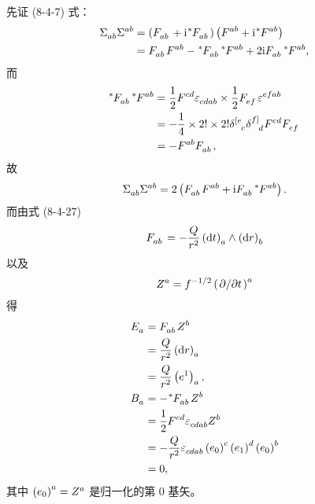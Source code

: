 \begin{xiti}
	\begin{zm}
		先证 (8-4-7) 式：
		\begin{equation*}
			\begin{split}
				\tensor{\Sigma}{_a_b} \tensor{\Sigma}{^a^b} &= \left( \tensor{F}{_a_b} + \ii \tensor[^*]{F}{_a_b} \right) \left( \tensor{F}{^a^b} + \ii \tensor[^*]{F}{^a^b} \right)\\
				&= \tensor{F}{_a_b} \tensor{F}{^a^b} - \tensor[^*]{F}{_a_b} \tensor[^*]{F}{^a^b} + 2\ii \tensor{F}{_a_b} \tensor[^*]{F}{^a^b},
			\end{split}
		\end{equation*}
		而
		\begin{equation}
			\begin{split}
				\tensor[^*]{F}{_a_b} \tensor[^*]{F}{^a^b} &= \frac{1}{2} \tensor{F}{^c^d} \tensor{\varepsilon}{_c_d_a_b} \times \frac{1}{2} \tensor{F}{_e_f} \tensor{\varepsilon}{^e^f^a^b}\\
				&= - \frac{1}{4} \times 2! \times 2! \tensor{\delta}{^{[e}_c} \tensor{\delta}{^{f]}_d} \tensor{F}{^c^d} \tensor{F}{_e_f}\\
				&= - \tensor{F}{^a^b} \tensor{F}{_a_b},
			\end{split}\label{eq-F*F*}
		\end{equation}
		故
		\begin{equation}
			\begin{split}
				\tensor{\Sigma}{_a_b} \tensor{\Sigma}{^a^b} = 2 \left( \tensor{F}{_a_b} \tensor{F}{^a^b} + \ii \tensor{F}{_a_b} \tensor[^*]{F}{^a^b} \right).\label{eq-SS}
			\end{split}
		\end{equation}
		而由式 (8-4-27)
		\begin{equation*}
			\tensor{F}{_a_b} = - \frac{Q}{r^2} \tensor{\left( \dd{t} \right)}{_a} \wedge \tensor{\left( \dd{r} \right)}{_b}
		\end{equation*}
		以及
		\begin{equation*}
			\tensor{Z}{^a} = f^{-1/2} \tensor{\left( \pdv*{t} \right)}{^a}
		\end{equation*}
		得
		\begin{equation*}
			\begin{split}
				\tensor{E}{_a} &= \tensor{F}{_a_b} \tensor{Z}{^b}\\
				&= \frac{Q}{r^2} \tensor{\left( \dd{r} \right)}{_a}\\
				&= \frac{Q}{r^2} \tensor{\left( e^1 \right)}{_a},\\
				\tensor{B}{_a} &= - \tensor[^*]{F}{_a_b} \tensor{Z}{^b}\\
				&= \frac{1}{2} \tensor{F}{^c^d} \tensor{\varepsilon}{_c_d_a_b} \tensor{Z}{^b}\\
				&= - \frac{Q}{r^2} \tensor{\varepsilon}{_c_d_a_b} \tensor{\left( e_0 \right)}{^c} \tensor{\left( e_1 \right)}{^d} \tensor{\left( e_0 \right)}{^b}\\
				&= 0,
			\end{split}
		\end{equation*}
		其中 $\tensor{\left( e_0 \right)}{^a} = \tensor{Z}{^a}$ 是归一化的第 0 基矢。
	\end{zm}


\end{xiti}
